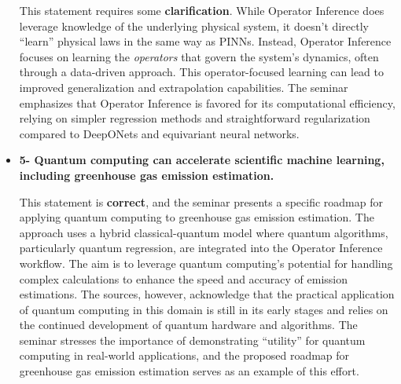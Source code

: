 \documentclass[
]{article}
\begin{document}
\begin{itemize}
  This statement requires some \textbf{clarification}. While Operator
  Inference does leverage knowledge of the underlying physical system,
  it doesn't directly ``learn'' physical laws in the same way as PINNs.
  Instead, Operator Inference focuses on learning the \emph{operators}
  that govern the system's dynamics, often through a data-driven
  approach. This operator-focused learning can lead to improved
  generalization and extrapolation capabilities. The seminar emphasizes
  that Operator Inference is favored for its computational efficiency,
  relying on simpler regression methods and straightforward
  regularization compared to DeepONets and equivariant neural networks.
\item
  \textbf{5- Quantum computing can accelerate scientific machine
  learning, including greenhouse gas emission estimation.}

  This statement is \textbf{correct}, and the seminar presents a
  specific roadmap for applying quantum computing to greenhouse gas
  emission estimation. The approach uses a hybrid classical-quantum
  model where quantum algorithms, particularly quantum regression, are
  integrated into the Operator Inference workflow. The aim is to
  leverage quantum computing's potential for handling complex
  calculations to enhance the speed and accuracy of emission
  estimations. The sources, however, acknowledge that the practical
  application of quantum computing in this domain is still in its early
  stages and relies on the continued development of quantum hardware and
  algorithms. The seminar stresses the importance of demonstrating
  ``utility'' for quantum computing in real-world applications, and the
  proposed roadmap for greenhouse gas emission estimation serves as an
  example of this effort.
\end{itemize}
\end{document}
